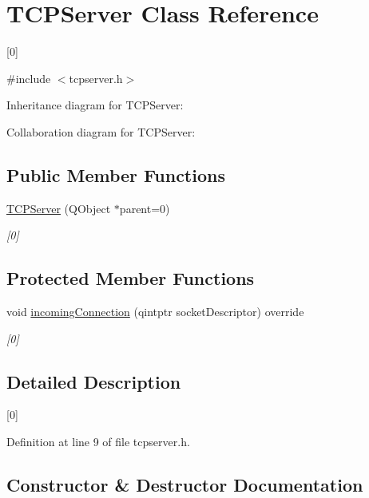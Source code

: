 \hypertarget{classTCPServer}{}\section{T\+C\+P\+Server Class Reference}
\label{classTCPServer}


\mbox{[}0\mbox{]}  




{\ttfamily \#include $<$tcpserver.\+h$>$}



Inheritance diagram for T\+C\+P\+Server\+:


Collaboration diagram for T\+C\+P\+Server\+:
\subsection*{Public Member Functions}
\begin{DoxyCompactItemize}
\item 
\hyperlink{classTCPServer_ae10407422f0967ccb3f6c5468df0371f}{T\+C\+P\+Server} (Q\+Object $\ast$parent=0)
\begin{DoxyCompactList}\small\item\em \mbox{[}0\mbox{]} \end{DoxyCompactList}\end{DoxyCompactItemize}
\subsection*{Protected Member Functions}
\begin{DoxyCompactItemize}
\item 
void \hyperlink{classTCPServer_af1df9d80f25034148ed588e7fa2d4ab7}{incoming\+Connection} (qintptr socket\+Descriptor) override
\begin{DoxyCompactList}\small\item\em \mbox{[}0\mbox{]} \end{DoxyCompactList}\end{DoxyCompactItemize}


\subsection{Detailed Description}
\mbox{[}0\mbox{]} 

Definition at line 9 of file tcpserver.\+h.



\subsection{Constructor \& Destructor Documentation}
\mbox{\label{classTCPServer_ae10407422f0967ccb3f6c5468df0371f}} 
